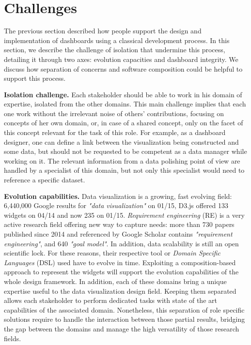 \documentclass{sigplanconf}
\begin{document}
\section{Challenges}

The previous section described how people support the design and
implementation of dashboards using a classical development process. In
this section, we describe the challenge of isolation that undermine
this process, detailing it through two axes: evolution capacities and
dashboard integrity. We discuss how separation of concerns and
software composition could be helpful to support this process.


\textbf{Isolation challenge.}  Each stakeholder should be able to work
in his domain of expertise, isolated from the other domains. This main
challenge implies that each one work without the irrelevant noise of
others' contributions, focusing on concepts of her own domain, or, in
case of a shared concept, only on the facet of this concept relevant
for the task of this role.  For example, as a dashboard designer, one
can define a link between the visualization being constructed and some
data, but should not be requested to be competent as a data manager
while working on it.  The relevant information from a data polishing
point of view are handled by a specialist of this domain, but not only
this specialist would need to reference a specific dataset.

\textbf{Evolution capabilities.}  Data visualization is a growing,
fast evolving field: 6,440,000 Google results for \emph{"data
  visualization"} on 01/15, D3.js offered 133 widgets on 04/14 and now
235 on 01/15. \emph{Requirement engineering} (RE) is a very active
research field offering new way to capture needs: more than 730 papers
published since 2014 and referenced by Google Scholar contains
\emph{"requirement engineering"}, and 640 \emph{"goal model"}. In
addition, data scalability is still an open scientific lock. For these
reasons, their respective tool or \emph{Domain Specific Languages}
(DSL) used have to evolve in time.  Exploiting a composition-based
approach to represent the widgets will support the evolution
capabilities of the whole design framework. In addition, each of these
domains bring a unique expertise useful to the data visualization
design field. Keeping them separated allows each stakeholder to
perform dedicated tasks with state of the art capabilities of the
associated domain.  Nonetheless, this separation of role specific
solutions require to handle the interaction between those partial
results, bridging the gap between the domains and manage the high
versatility of those research fields.
\end{document}
